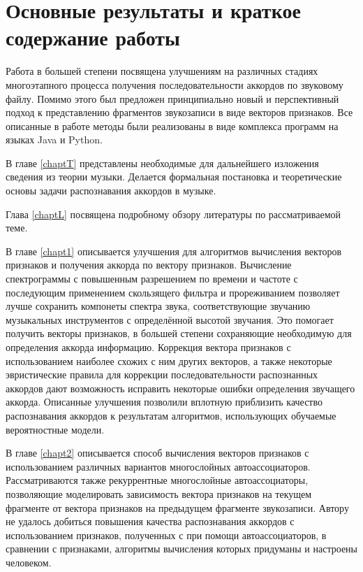\section{Основные результаты и краткое содержание работы}

Работа в большей степени посвящена улучшениям на различных стадиях многоэтапного
процесса получения последовательности аккордов по звуковому файлу. Помимо этого
был предложен принципиально новый и перспективный подход к представлению
фрагментов звукозаписи в виде векторов признаков. Все описанные в работе методы
были реализованы в виде комплекса программ на языках Java и Python.

В главе \ref{chaptT} представлены необходимые для дальнейшего изложения сведения
из теории музыки. Делается формальная постановка и теоретические основы задачи
распознавания аккордов в музыке.

Глава \ref{chaptL} посвящена подробному обзору литературы по рассматриваемой
теме. 

В главе \ref{chapt1} описывается улучшения для алгоритмов вычисления векторов
признаков и получения аккорда по вектору признаков. Вычисление спектрограммы с
повышенным разрешением по времени и частоте с последующим применением
скользящего фильтра и прореживанием позволяет лучше сохранить компонеты спектра
звука, соответствующие звучанию музыкальных инструментов с определённой высотой
звучания. Это помогает получить векторы признаков, в большей степени сохраняющие
необходимую для определения аккорда информацию. Коррекция вектора признаков с
использованием наиболее схожих с ним других векторов, а также некоторые
эвристические правила для коррекции последовательности распознанных аккордов
дают возможность исправить некоторые ошибки определения звучащего аккорда.
Описанные улучшения позволили вплотную приблизить качество распознавания
аккордов к результатам алгоритмов, использующих обучаемые вероятностные модели.

В главе \ref{chapt2} описывается способ вычисления векторов признаков с
использованием различных вариантов многослойных автоассоциаторов.
Рассматриваются также рекуррентные многослойные автоассоциаторы, позволяющие
моделировать зависимость вектора признаков на текущем фрагменте от вектора
признаков на предыдущем фрагменте звукозаписи. Автору не удалось добиться
повышения качества распознавания аккордов с использованием признаков,
полученных с при помощи автоассоциаторов, в сравнении с признаками, алгоритмы
вычисления которых придуманы и настроены человеком.

